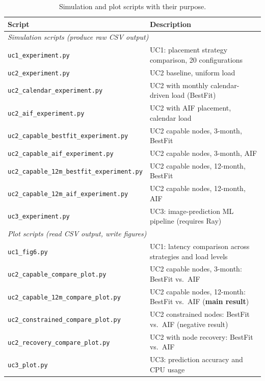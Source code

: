 \documentclass[11pt, a4paper]{article}
\begin{document}
\begin{appendices}
\begin{table}[ht]
\centering
\caption{Simulation and plot scripts with their purpose.}
\label{tab:scripts}
\begin{tabularx}{\linewidth}{lX}
\toprule
\textbf{Script} & \textbf{Description} \\
\midrule
\multicolumn{2}{l}{\textit{Simulation scripts (produce raw CSV output)}} \\
\midrule
\texttt{uc1\_experiment.py} &
  UC1: placement strategy comparison, 20 configurations \\
\texttt{uc2\_experiment.py} &
  UC2 baseline, uniform load \\
\texttt{uc2\_calendar\_experiment.py} &
  UC2 with monthly calendar-driven load (BestFit) \\
\texttt{uc2\_aif\_experiment.py} &
  UC2 with AIF placement, calendar load \\
\texttt{uc2\_capable\_bestfit\_experiment.py} &
  UC2 capable nodes, 3-month, BestFit \\
\texttt{uc2\_capable\_aif\_experiment.py} &
  UC2 capable nodes, 3-month, AIF \\
\texttt{uc2\_capable\_12m\_bestfit\_experiment.py} &
  UC2 capable nodes, 12-month, BestFit \\
\texttt{uc2\_capable\_12m\_aif\_experiment.py} &
  UC2 capable nodes, 12-month, AIF \\
\texttt{uc3\_experiment.py} &
  UC3: image-prediction ML pipeline (requires Ray) \\
\midrule
\multicolumn{2}{l}{\textit{Plot scripts (read CSV output, write figures)}} \\
\midrule
\texttt{uc1\_fig6.py} &
  UC1: latency comparison across strategies and load levels \\
\texttt{uc2\_capable\_compare\_plot.py} &
  UC2 capable nodes, 3-month: BestFit vs.\ AIF \\
\texttt{uc2\_capable\_12m\_compare\_plot.py} &
  UC2 capable nodes, 12-month: BestFit vs.\ AIF (\textbf{main result}) \\
\texttt{uc2\_constrained\_compare\_plot.py} &
  UC2 constrained nodes: BestFit vs.\ AIF (negative result) \\
\texttt{uc2\_recovery\_compare\_plot.py} &
  UC2 with node recovery: BestFit vs.\ AIF \\
\texttt{uc3\_plot.py} &
  UC3: prediction accuracy and CPU usage \\
\bottomrule
\end{tabularx}
\end{table}


\end{appendices}
\end{document}
